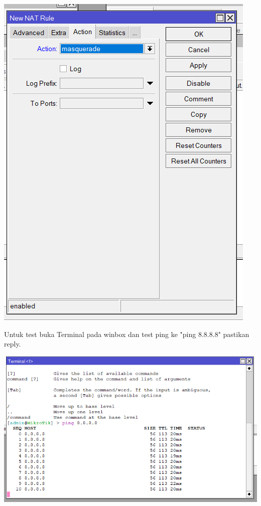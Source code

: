 \begin{enumerate}
\begin{center}
        \includegraphics[scale=0.5]{P1/img/14.png}
    \end{center}
    
    Untuk test buka Terminal pada winbox dan test ping ke "ping 8.8.8.8" pastikan reply.
    \begin{center}
        \includegraphics[scale=0.5]{P1/img/12.png}
    \end{center}


\end{enumerate}
